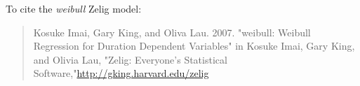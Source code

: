 To cite the \emph{ weibull } Zelig model:
 \begin{verse}
 Kosuke Imai, Gary King, and Oliva Lau. 2007. "weibull: Weibull Regression for Duration Dependent Variables" in Kosuke Imai, Gary King, and Olivia Lau, "Zelig: Everyone's Statistical Software,"\url{http://gking.harvard.edu/zelig} 
\end{verse}
